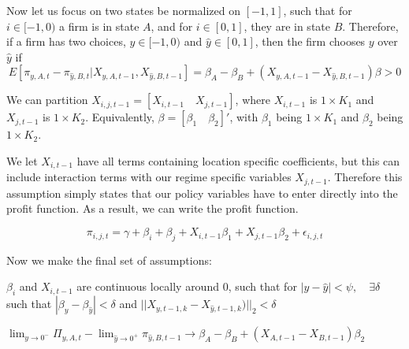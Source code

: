 Now let us focus on two states be normalized on $[-1,1]$, such that for $i \in [-1,0)$ a firm is in state $A$, and for $i \in [0,1]$, they are in state $B$. Therefore, if a firm has two choices, $y \in [-1,0)$ and $\hat y \in [0,1]$, then the firm chooses $y$ over $\hat y$ if
\begin{equation}\label{diff}
E[\pi_{y,A,t}-\pi_{\hat y,B,t}|X_{y,A,t-1},X_{\hat y,B,t-1}] = \beta_{A}-\beta_{B}+(X_{y,A,t-1}-X_{\hat y,B,t-1})\beta > 0
\end{equation}

\begin{assumption}\label{partition}
We can partition $X_{i,j,t-1} = [X_{i,t-1} \quad X_{j,t-1}]$, where $X_{i,t-1}$ is $1 \times K_{1}$ and $X_{j,t-1}$ is $1 \times K_{2}$. Equivalently, $\beta = [\beta_{1} \quad \beta_{2}]'$, with $\beta_{1}$ being $1 \times K_{1}$ and $\beta_{2}$ being $1 \times K_{2}$.
\end{assumption}

We let $X_{i,t-1}$ have all terms containing location specific coefficients, but this can include interaction terms with our regime specific variables $X_{j,t-1}$. Therefore this assumption simply states that our policy variables have to enter directly into the profit function. As a result, we can write the profit function.

\begin{equation}\label{profit2}
\pi_{i,j,t} =  \gamma+\beta_{i}+\beta_{j}+X_{i,t-1}\beta_{1}+X_{j,t-1}\beta_{2}+\epsilon_{i,j,t}
\end{equation}

Now we make the final set of assumptions:
\begin{assumption}\label{cont}
$\beta_{i}$ and $X_{i,t-1}$ are continuous locally around $0$, such that for $|y - \hat y| < \psi, \quad \exists \delta$ such that $|\beta_{y}-\beta_{\hat y}| < \delta$ and $||X_{y,t-1,k}-X_{\hat y,t-1,k})||_{2} < \delta$
\end{assumption}

\begin{theorem}\label{thrm}
$\lim_{y \to 0^{-}} \Pi_{y,A,t}-\lim_{\hat y \to 0^{+}}\pi_{\hat y,B,t-1} \to \beta_{A}-\beta_{B}+(X_{A,t-1}-X_{B,t-1})\beta_{2}$
\end{theorem}

